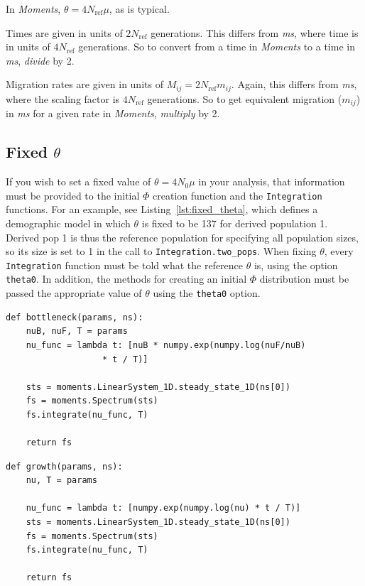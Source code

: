 \documentclass[12pt]{article}
\makeatletter
\newcommand{\Nref}{\ensuremath{N_\text{ref}}\xspace}
\newcommand{\ms}{\emph{ms}\xspace}
\newcommand{\py}[1]{\lstinline[breaklines=true,language=Python, showstringspaces=False]@#1@}
\makeatother
\begin{document}
In \textit{Moments}, $\theta = 4 \Nref \mu$, as is typical.

Times are given in units of $2 \Nref$ generations.
This differs from \emph{ms}, where time is in units of $4 \Nref$ generations.
So to convert from a time in \textit{Moments} to a time in \emph{ms}, \emph{divide} by 2.

Migration rates are given in units of $M_{ij} = 2 \Nref m_{ij}$.
Again, this differs from \emph{ms}, where the scaling factor is $4 \Nref$ generations.
So to get equivalent migration ($m_{ij}$) in \ms for a given rate in \textit{Moments}, \emph{multiply} by 2.


\subsection{Fixed $\theta$}\label{sec:fixed_theta}

If you wish to set a fixed value of $\theta = 4 N_0 \mu$ in your analysis, that information must be provided to the initial $\Phi$ creation function and the \py{Integration} functions.
For an example, see Listing~\ref{lst:fixed_theta}, which defines a demographic model in which $\theta$ is fixed to be 137 for derived population 1.
Derived pop 1 is thus the reference population for specifying all population sizes, so its size is set to 1 in the call to \py{Integration.two_pops}.
When fixing $\theta$, every \py{Integration} function must be told what the reference $\theta$ is, using the option \py{theta0}.
In addition, the methods for creating an initial $\Phi$ distribution must be passed the appropriate value of $\theta$ using the \py{theta0} option.

\clearpage

\begin{lstlisting}[caption={\textbf{Bottleneck:} At time \py{TF} + \py{TB} in the past, an equilibrium population goes through a bottleneck of depth \py{nuB}, recovering to relative size \py{nuF}.}, float, label={lst:bottleneck}]
def bottleneck(params, ns):
    nuB, nuF, T = params
    nu_func = lambda t: [nuB * numpy.exp(numpy.log(nuF/nuB) 
    			   * t / T)]

    sts = moments.LinearSystem_1D.steady_state_1D(ns[0])
    fs = moments.Spectrum(sts)
    fs.integrate(nu_func, T)

    return fs
\end{lstlisting}

\begin{lstlisting}[caption={\textbf{Exponential growth:} At time \py{T} in the past, an equilibrium population begins growing exponentially, reaching size \py{nu} at present.}, float]
def growth(params, ns):
    nu, T = params

    nu_func = lambda t: [numpy.exp(numpy.log(nu) * t / T)]
    sts = moments.LinearSystem_1D.steady_state_1D(ns[0])
    fs = moments.Spectrum(sts)
    fs.integrate(nu_func, T)

    return fs
\end{lstlisting}
\end{document}
